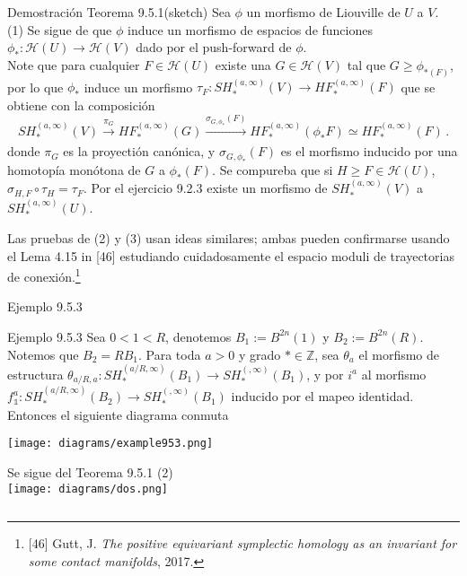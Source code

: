 \documentclass{beamer}
\begin{document}
\begin{frame}{Demostraci\'on Teorema 9.5.1}{(sketch)}
Sea $\phi$ un morfismo de Liouville de $U$ a $V$. \\
\vspace{1em}
(1) Se sigue de que $\phi$ induce un morfismo de espacios de funciones $\phi_{\ast}:\mathcal{H}(U)\rightarrow\mathcal{H}(V)$ dado por el push-forward de $\phi$.\\
Note que para cualquier $F\in \mathcal{H}(U)$ existe una $G\in \mathcal{H}(V)$ tal que $G\geq \phi_{\ast (F)}$, por lo que $\phi_{\ast}$ induce un morfismo $\tau_{F}:SH_{\ast}^{(a,\infty)}(V)\rightarrow HF_{\ast}^{(a,\infty)}(F)$ que se obtiene con la composici\'on
$$SH_{\ast}^{(a,\infty)}(V) \xrightarrow[]{\pi_{G}} HF_{\ast}^{(a,\infty)}(G) \xrightarrow[]{\sigma_{G,\phi_{\ast}}(F)} HF_{\ast}^{(a,\infty)}(\phi_\ast F)\simeq HF_{\ast}^{(a,\infty)}(F)\,. $$
donde $\pi_{G}$ es la proyecti\'on can\'onica, y $\sigma_{G,\phi_{\ast}}(F)$ es el morfismo inducido por una homotop\'ia mon\'otona de $G$ a $\phi_{\ast}(F)$. Se compureba que si $H\geq F \in \mathcal{H}(U)$, $\sigma_{H,F}\circ \tau_{H}=\tau_{F}$. Por el ejercicio 9.2.3 existe un morfismo de $SH_{\ast}^{(a,\infty)}(V)$ a $SH_{\ast}^{(a,\infty)}(U)$.
\end{frame}

\begin{frame}
Las pruebas de (2) y (3) usan ideas similares; ambas pueden confirmarse usando el Lema 4.15 in [46] estudiando cuidadosamente el espacio moduli de trayectorias de conexi\'on.\footnote{[46] Gutt, J. \emph{The positive equivariant symplectic homology as an invariant for some contact manifolds}, 2017.}
\end{frame}

\begin{frame}{Ejemplo 9.5.3}
\begin{block}{Ejemplo 9.5.3}
Sea $0<1<R$, denotemos $B_1:=B^{2n}(1)$ y $B_2:=B^{2n}(R)$. Notemos que $B_2=RB_1$. Para toda $a>0$ y grado $\ast\in\mathbb{Z}$, sea $\theta_{a}$ el morfismo de estructura $\theta_{a/R,a}:SH_{\ast}^{(a/R,\infty)}(B_1)\rightarrow SH_{\ast}^{(,\infty)}(B_1)$, y por $i^{a}$ al morfismo $f_{\mathbb{1}}^{a}:SH_{\ast}^{(a/R,\infty)}(B_2)\rightarrow SH_{\ast}^{(,\infty)}(B_1)$ inducido por el mapeo identidad. Entonces el siguiente diagrama conmuta
\begin{center}
\texttt{[image: diagrams/example953.png]}\\
\begin{minipage}{0.45\textwidth}
Se sigue del Teorema 9.5.1 (2)\\
\texttt{[image: diagrams/dos.png]}
\end{minipage}\hfill $\,$
\end{center}
\end{block}
\end{frame}
\end{document}
